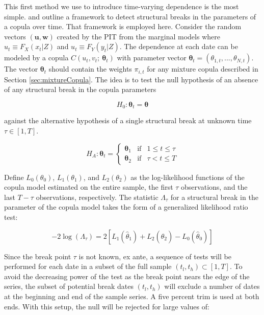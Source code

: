 \documentclass[12pt]{article}
\begin{document}
This first method we use to introduce time-varying dependence is the most simple. \cite{Dias_and_Embrechts_2004} and \cite{Dias_and_Embrechts_2009} outline a framework to detect structural breaks in the parameters of a copula over time. That framework is employed here. Consider the random vectors $\left(\boldsymbol{u}, \boldsymbol{w}\right)$ created by the PIT from the marginal models where $u_{t}\equiv F_{X}\left(x_{t}|Z\right)$ and $u_{t}\equiv F_{Y}\left(y_{t} | Z\right)$. The dependence at each date can be modeled by a copula $C\left(u_{t}, v_{t};~\boldsymbol{\theta}_{t}\right)$ with parameter vector $\boldsymbol{\theta}_{t}=(\theta_{1,t},...,\theta_{N,t})$. The vector $\boldsymbol{\theta}_{t}$ should contain the weights $\pi _{i,t}$ for any mixture copula described in Section \ref{sec:mixtureCopula}. The idea is to test the null hypothesis of an absence of any structural break in the copula parameters

\begin{equation}
	H_{0}:\boldsymbol{\theta}_{t} = \boldsymbol{\theta}
\end{equation}

against the alternative hypothesis of a single structural break at unknown time $\tau \in \left[1, T\right]$.

\begin{equation}
H_{A}:\boldsymbol{\theta}_{t} = \left\{
\begin{array}{ccc}
    \boldsymbol{\theta}_{1} & \text{if} & 1\leq t \leq \tau \\ 
    \boldsymbol{\theta}_{2} & \text{if} & \tau < t \leq T
\end{array}
\right. 
\end{equation}

Define $L_{0}\left(\theta_{0}\right)$, $L_{1}\left(\theta_{1}\right)$, and $L_{2}\left(\theta_{2}\right)$ as the log-likelihood functions of the copula model estimated on the entire sample, the first $\tau$ observations, and the last $T-\tau$ observations, respectively. The statistic $\Lambda_{\tau}$ for a structural break in the parameter of the copula model takes the form of a generalized likelihood ratio test:

\begin{equation}
	-2\log \left(\Lambda_{\tau}\right) = 2\left[L_{1}\left(\hat{\theta}_{1}\right) + L_{2}\left(\hat{\theta}_{2}\right) - L_{0}\left(\hat{\theta}_{0}\right)\right]
\end{equation}

Since the break point $\tau$ is not known, ex ante, a sequence of tests will be performed for each date in a subset of the full sample $\left(t_{l},t_{h}\right) \subset \left[1, T\right]$. To avoid the decreasing power of the test as the break point nears the edge of the series, the subset of potential break dates $\left( t_{l},t_{h}\right)$ will exclude a number of dates at the beginning and end of the sample series. A five percent trim is used at both ends. With this setup, the null will be rejected for large values of:
\end{document}
